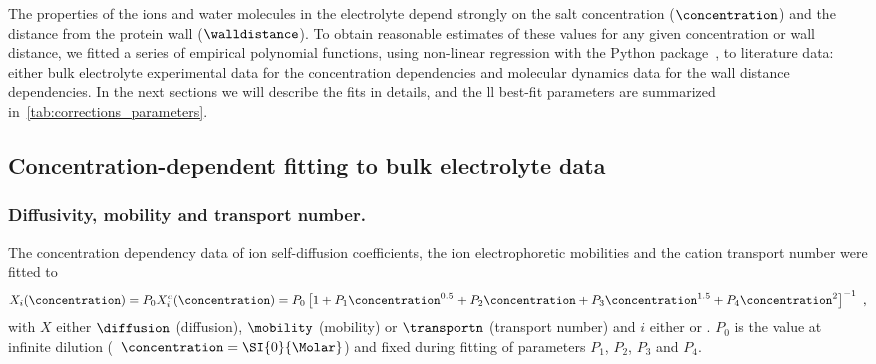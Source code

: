 The properties of the ions and water molecules in the electrolyte depend strongly on the salt concentration
($\concentration$) and the distance from the protein wall ($\walldistance$). To obtain reasonable estimates of
these values for any given  concentration or wall distance, we fitted a series of empirical
polynomial functions, using non-linear regression with the  Python package~\cite{Newville-2014},
to literature data: either bulk electrolyte experimental data for the concentration dependencies and molecular
dynamics data for the wall distance dependencies. In the next sections we will describe the fits in details,
and the ll best-fit parameters are summarized in~\cref{tab:corrections_parameters}.

%
\subsection{Concentration-dependent fitting to bulk electrolyte data}
%

\subsubsection{Diffusivity, mobility and transport number.}
%
The  concentration dependency data of ion self-diffusion coefficients, the ion electrophoretic
mobilities and the cation transport number were fitted to
%
\begin{align}\label{eq:concentration_d_mu_tna}
  X_{i} (\concentration) = P_0 X_{i}^c (\concentration) =
  P_0 \left[ 1
           + P_1 \concentration^{0.5}
           + P_2 \concentration
           + P_3 \concentration^{1.5}
           + P_4 \concentration^2 
      \right]^{-1}
  \text{ ,}
\end{align}
%
with $X$ either $\diffusion$ (diffusion), $\mobility$ (mobility) or $\transportn$ (transport number) and $i$
either \Na{} or \Cl{}. $P_0$ is the value at infinite dilution (\ie~$\concentration = \SI{0}{\Molar}$) and
fixed during fitting of parameters $P_1$, $P_2$, $P_3$ and $P_4$.

